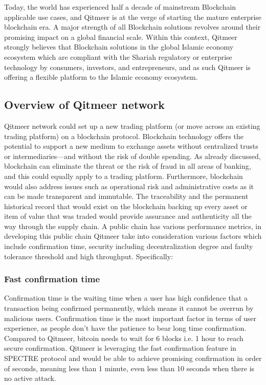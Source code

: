 \documentclass[a4paper,11pt]{article}
\begin{document}
Today, the world has experienced half a decade of mainstream Blockchain applicable use cases, and Qitmeer is at the verge of starting the mature enterprise blockchain era. A major strength of all Blockchain solutions revolves around their promising impact on a global financial scale. Within this context, Qitmeer strongly believes that Blockchain solutions in the global Islamic economy ecosystem which are compliant with the Shariah regulatory or enterprise technology by consumers, investors, and entrepreneurs, and as such Qitmeer is offering a flexible platform to the Islamic economy ecosystem.

\subsection{Overview of Qitmeer network}
Qitmeer network could set up a new trading platform (or move across an existing trading platform) on a blockchain protocol. Blockchain technology offers the potential to support a new medium to exchange assets without centralized trusts or intermediaries—and without the risk of double spending\cite{double-spend}. As already discussed, blockchain can eliminate the threat or the risk of fraud in all areas of banking, and this could equally apply to a trading platform. Furthermore, blockchain would also address issues such as operational risk and administrative costs as it can be made transparent and immutable. The traceability and the permanent historical record that would exist on the blockchain backing up every asset or item of value that was traded would provide assurance and authenticity all the way through the supply chain. A public chain has various performance metrics, in developing this public chain Qitmeer take into consideration various factors which include confirmation time, security including decentralization degree and faulty tolerance threshold and high throughput. Specifically:

\subsubsection{Fast confirmation time}

Confirmation time is the waiting time when a user has high confidence that a transaction being confirmed permanently, which means it cannot be overrun by malicious users. Confirmation time is the most important factor in terms of user experience, as people don't have the patience to bear long time confirmation. Compared to Qitmeer, bitcoin needs to wait for 6 blocks i.e. 1 hour to reach secure confirmation. Qitmeer is leveraging the fast confirmation feature in SPECTRE protocol and would be able to achieve promising confirmation in order of seconds, meaning less than 1 minute, even less than 10 seconds when there is no active attack.
\end{document}
